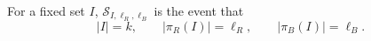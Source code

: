 \begin{definition}
For a fixed set \(I\), \(\mathcal S_{I,\ell_R,\ell_B}\) is the event that
\[
|I|=k,\qquad |\pi_R(I)|=\ell_R,\qquad |\pi_B(I)|=\ell_B.
\]
\end{definition}
